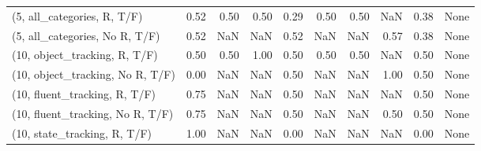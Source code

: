 \begin{table*}[h!]
\begin{adjustbox}{width=2\columnwidth,center}
\begin{tabular}{lrrr|rrr|rrr}
(5, all\_categories, R, T/F)          &                      0.52 &                  0.50 &                      0.50 &                          0.29 &                      0.50 &                          0.50 &                                    NaN &                               0.38 &                                  None \\
(5, all\_categories, No R, T/F)       &                      0.52 &                   NaN &                       NaN &                          0.52 &                       NaN &                           NaN &                                   0.57 &                               0.38 &                                  None \\



\midrule
(10, object\_tracking, R, T/F)         &                      0.50 &                  0.50 &                      1.00 &                          0.50 &                      0.50 &                          0.50 &                                    NaN &                               0.50 &                                  None \\
(10, object\_tracking, No R, T/F)      &                      0.00 &                   NaN &                       NaN &                          0.50 &                       NaN &                           NaN &                                   1.00 &                               0.50 &                                  None \\
(10, fluent\_tracking, R, T/F)         &                      0.75 &                   NaN &                       NaN &                          0.50 &                       NaN &                           NaN &                                    NaN &                               0.50 &                                  None \\
(10, fluent\_tracking, No R, T/F)      &                      0.75 &                   NaN &                       NaN &                          0.50 &                       NaN &                           NaN &                                   0.50 &                               0.50 &                                  None \\
(10, state\_tracking, R, T/F)          &                      1.00 &                   NaN &                       NaN &                          0.00 &                       NaN &                           NaN &                                    NaN &                               0.00 &                                  None \\

\end{tabular}
\end{adjustbox}
\end{table*}
